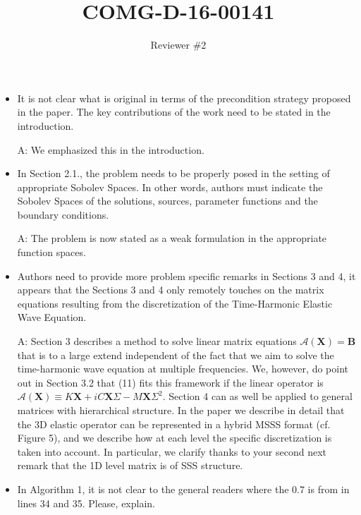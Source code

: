\documentclass{article}
\begin{document}
\title{\bf COMG-D-16-00141}
\author{Reviewer \#2}

\maketitle

\begin{itemize}
 
\item It is not clear what is original in terms of the precondition strategy proposed in the paper. The key contributions of the work need to be stated in the introduction. 

{\color{red}A: We emphasized this in the introduction.}

\item In Section 2.1., the problem needs to be properly posed in the setting of appropriate Sobolev Spaces. In other words, authors must indicate the Sobolev Spaces of the solutions, sources, parameter functions and the boundary conditions.

{\color{red}A: The problem is now stated as a weak formulation in the appropriate function spaces.}
	
\item Authors need to provide more problem specific remarks in Sections 3 and 4, it appears that the Sections 3 and 4 only remotely touches on the matrix equations resulting from the discretization of the Time-Harmonic Elastic Wave Equation.

{\color{red}A: Section 3 describes a method to solve linear matrix equations $\mathcal{A}(\mathbf{X}) = \mathbf{B}$ that is to a large extend independent of the fact that we aim to solve the time-harmonic wave equation at multiple frequencies. We, however, do point out in Section 3.2 that (11) fits this framework if the linear operator is $\mathcal{A}(\mathbf{X}) \equiv K\mathbf{X} + i C \mathbf{X} \Sigma - M \mathbf{X} \Sigma^2$. Section 4 can as well be applied to general matrices with hierarchical structure. In the paper we describe in detail that the 3D elastic operator can be represented in a hybrid MSSS format (cf. Figure 5), and we describe how at each level the specific discretization is taken into account. In particular, we clarify thanks to your second next remark that the 1D level matrix is of SSS structure.}

\item In Algorithm 1, it is not clear to the general readers where the 0.7 is from in lines 34 and 35. Please, explain.


\end{itemize}
\end{document}
